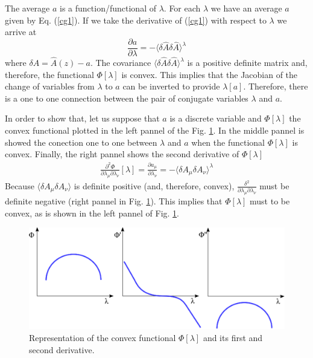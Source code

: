 \documentclass[b5paper,openright,11pt]{book}
\newcommand{\Tirar}[1]{{\color{Magenta}#1}}   %
\begin{document}
The average $a$  is a function/functional of  $\lambda$. For each
$\lambda$ we  have an average  $a$ given  by Eq. (\ref{cg1}).   If we
take the derivative of (\ref{cg1}) with respect to $\lambda$ we arrive
at
\begin{equation}
\frac{\partial a }{\partial \lambda}= -\langle \delta \hat{A}\delta
\hat{A}\rangle^\lambda
\label{covariances}
\end{equation}
where $\delta  A =  \hat{A}(z)-a$.  The  covariance $\langle  \delta \hat{A}\delta
\hat{A}\rangle^{\lambda}$ is a positive definite matrix and, therefore, the functional
$\Phi[\lambda]$  is convex.  This  implies that  the  Jacobian of  the
change of variables  from $\lambda$ to $a$ can be  inverted to provide
$\lambda[a]$.   Therefore, there  is  a  one to  one  connection
between the  pair of conjugate  variables $\lambda$ and  $a$.


\Tirar{
In order to show that, let us suppose that $a$ is a discrete variable and $\Phi[\lambda]$ the convex functional plotted in the left pannel of the Fig. \ref{fig:PhiConvex}. 
In the middle pannel is showed the conection one to one between $\lambda$ and $a$ when the functional $\Phi[\lambda]$ is convex.
Finally, the right pannel shows the second derivative of $\Phi[\lambda]$ 
\begin{align}
    \frac{\partial^2 \Phi}{\partial\lambda_{\mu}\partial\lambda_{\nu}}[\lambda]
    =\frac{\partial a_{\mu}}{\partial\lambda_{\nu}}
    =-\langle\delta A_{\mu}\delta A_{\nu}\rangle^{\lambda}
\end{align}
Because $\langle\delta A_{\mu}\delta A_{\nu}\rangle$ is definite positive (and, therefore, convex), $\frac{\delta^2}{\partial\lambda_{\mu}\partial\lambda_{\nu}}$ must be definite negative (right pannel in Fig. \ref{fig:PhiConvex}). This implies that $\Phi[\lambda]$ must to be convex, as is shown in the left pannel of Fig. \ref{fig:PhiConvex}.
\begin{figure}
    \centering
    \includegraphics[width=\linewidth]{PhiConvex}
    \caption[Connection one to one between $\lambda$ and $a$]{Representation of the convex functional $\Phi[\lambda]$ and its first and second derivative.}
    \label{fig:PhiConvex}
\end{figure}
}
\end{document}
